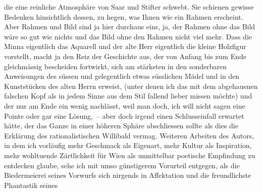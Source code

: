 \begin{ledgroupsized}[t]{13cm}
                    die eine reinliche Atmosphäre von Saar und
                        Stifter schwebt. Sie schienen gewisse
                    Bedenken hinsichtlich dessen, zu hegen, was Ihnen wie ein Rahmen erscheint. Aber
                    Rahmen und Bild sind ja hier durchaus eins, ja, der Rahmen ohne das Bild wäre so
                    gut wie nichts und das Bild ohne den Rahmen nicht viel mehr. Dass die Minna eigentlich das
                    Aquarell und der alte Herr eigentlich die kleine Holzfigur vorstellt, macht ja
                    den Reiz der Geschichte aus, der von Anfang bis zum Ende gleichmässig bescheiden
                    fortwirkt, sich am stärksten in den sonderbaren Anweisungen des süssen und
                    gelegentlich etwas süsslichen Mädel und in den Kunststücken des alten {\pb}Herrn erweist, (unter denen ich das mit dem
                    abgehauenen falschen Kopf als in jedem Sinne aus dem Stil fallend lieber missen
                    möchte) und der nur am Ende ein wenig nachlässt, weil man doch, ich will nicht
                    sagen eine Pointe oder gar eine Lösung, – aber doch irgend einen Schlusseinfall
                    erwartet hätte, der das Ganze in einer höheren Sphäre abschliessen sollte als
                    dies die Erklärung des rationalistischen Willibald vermag. Weiteren Arbeiten des Autors, in dem ich
                    vorläufig mehr Geschmack als Eigenart, mehr Kultur als Inspiration, mehr
                    wohltuende Zärtlichkeit für Wien als unmittelbar
                    poetische Empfindung zu entdecken glaube, sehe ich mit umso günstigerem
                    Vorurteil entgegen, als die Biedermeierei seines Vorwurfs \introOben{}sich\introOben{} nirgends in Affektation und die freundlichste Phantastik seines

\end{ledgroupsized}
